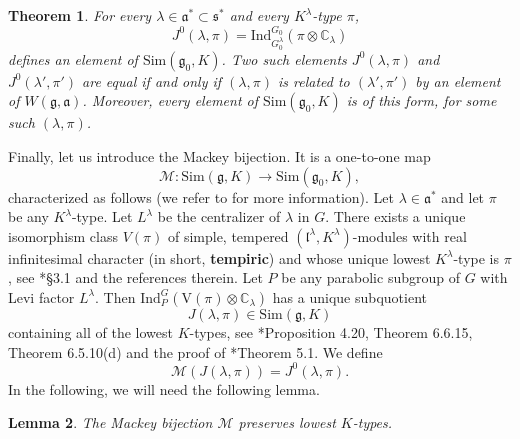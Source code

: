 \documentclass{amsart}
\newtheorem{theorem}{Theorem}[section]
\newtheorem{lemma}[theorem]{Lemma}
\theoremstyle{definition}
\begin{document}
\begin{theorem}
    For every $\lambda \in \mathfrak{a}^* \subset \mathfrak{s}^*$ and every $K^\lambda$-type $\pi$,
    \[J^0(\lambda,\pi) = \mathrm{Ind}_{G_0^\lambda}^{G_0} (\pi \otimes \mathbb{C}_\lambda)\]
    defines an element of $\mathrm{Sim}(\mathfrak{g}_0,K)$. Two such elements $J^0(\lambda, \pi)$ and $J^0(\lambda',\pi')$ are equal if and only if $(\lambda, \pi)$ is related to $(\lambda',\pi')$ by an element of $W(\mathfrak{g},\mathfrak{a})$. Moreover, every element of $\mathrm{Sim}(\mathfrak{g}_0,K)$ is of this form, for some such $(\lambda, \pi)$.
\end{theorem}

Finally, let us introduce the Mackey bijection. It is a one-to-one map \[\mathcal{M} : \mathrm{Sim}(\mathfrak{g},K) \to \mathrm{Sim}(\mathfrak{g}_0,K),\] characterized as follows (we refer to \cite{Afgoustidis1} for more information). Let $\lambda \in \mathfrak{a}^*$ and let $\pi$ be any $K^\lambda$-type. Let $L^\lambda$ be the centralizer of $\lambda$ in $G$. There exists a unique isomorphism class $V(\pi)$ of simple, tempered $(\mathfrak{l}^\lambda, K^\lambda)$-modules with real infinitesimal character (in short, \textbf{tempiric}) and whose unique lowest $K^\lambda$-type is $\pi$, see \cite{Afgoustidis1}*{§3.1} and the references therein. Let $P$ be any parabolic subgroup of $G$ with Levi factor $L^\lambda$. Then $\mathrm{Ind}_P^G(\mathrm{V}(\pi) \otimes \mathbb{C}_\lambda)$ has a unique subquotient
\begin{equation*}
    J(\lambda,\pi) \in \mathrm{Sim}(\mathfrak{g},K)
\end{equation*}
containing all of the lowest $K$-types, see \cite{VoganGreen}*{Proposition 4.20, Theorem 6.6.15, Theorem 6.5.10(d)} and the proof of \cite{Afgoustidis1}*{Theorem 5.1}. We define
\[ \mathcal{M} \left( J(\lambda,\pi)\right) = J^0(\lambda,\pi). \]
In the following, we will need the following lemma.

\begin{lemma}\label{preservesKtypes}
    The Mackey bijection $\mathcal{M}$ preserves lowest $K$-types.
\end{lemma}
\end{document}
